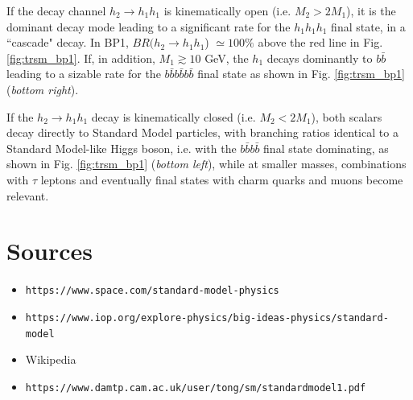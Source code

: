 \documentclass{article}
\begin{document}
If the decay channel $h_2 \rightarrow h_1 h_1$ is kinematically open (i.e. $M_2 > 2M_1$), it is the dominant decay mode leading to a significant rate for the $h_1 h_1 h_1$ final state, in a ``cascade" decay. In BP1, $BR(h_2 \rightarrow h_1h_1$) $\simeq 100\%$ above the red line in Fig. \ref{fig:trsm_bp1}. If, in addition, $M_1 \gtrsim 10$ GeV, the $h_1$ decays dominantly to $b\bar{b}$ leading to a sizable rate for the $b\bar{b}b\bar{b}b\bar{b}$ final state as shown in Fig. \ref{fig:trsm_bp1} (\textit{bottom right}).

If the $h_2 \rightarrow h_1 h_1$ decay is kinematically closed (i.e. $M_2 < 2M_1$), both scalars decay directly to Standard Model particles, with branching ratios identical to a Standard Model-like Higgs boson, i.e. with the $b\bar{b}b\bar{b}$ final state dominating, as shown in Fig. \ref{fig:trsm_bp1} (\textit{bottom left}), while at smaller masses, combinations with $\tau$ leptons and eventually final states with charm quarks and muons become relevant.

\section{Sources}

    \begin{itemize}
        \item \texttt{https://www.space.com/standard-model-physics}
        \item \texttt{https://www.iop.org/explore-physics/big-ideas-physics/standard-model}
        \item Wikipedia
        \item \texttt{https://www.damtp.cam.ac.uk/user/tong/sm/standardmodel1.pdf}
    \end{itemize}
\end{document}
